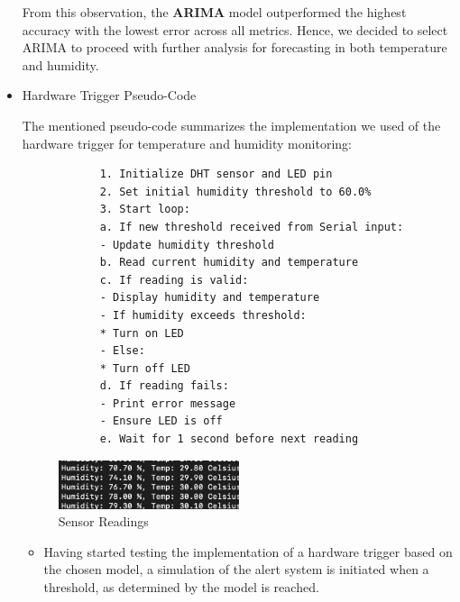 \documentclass[12pt]{article}
\begin{document}
\begin{itemize}
		
		From this observation, the \textbf{ARIMA} model outperformed the highest accuracy with the lowest error across all metrics. Hence, we decided to select ARIMA to proceed with further analysis for forecasting in both temperature and humidity.
		
		
		\item{Hardware Trigger Pseudo-Code}
		
		The mentioned pseudo-code summarizes the implementation we used of the hardware trigger for temperature and humidity monitoring:
		
		\begin{verbatim}
			1. Initialize DHT sensor and LED pin
			2. Set initial humidity threshold to 60.0%
			3. Start loop:
			a. If new threshold received from Serial input:
			- Update humidity threshold
			b. Read current humidity and temperature
			c. If reading is valid:
			- Display humidity and temperature
			- If humidity exceeds threshold:
			* Turn on LED
			- Else:
			* Turn off LED
			d. If reading fails:
			- Print error message
			- Ensure LED is off
			e. Wait for 1 second before next reading
		\end{verbatim}
		
		\begin{figure}[H]
			\centering
			\includegraphics[width=0.5\textwidth]{Images/Test/WhatsApp Image 2024-11-11 at 19.50.57_53e5664d.jpg}
			\caption{Sensor Readings}
		\end{figure}
		
		\begin{itemize}
			\item Having started testing the implementation of a hardware trigger based on the chosen model, a simulation of the alert system is initiated when a threshold, as determined by the model is reached. \\
			
			\begin{minipage}[H]{0.45\textwidth}
				\begin{figure}[H]
					

\end{figure}
\end{minipage}
\end{itemize}
\end{itemize}
\end{document}
